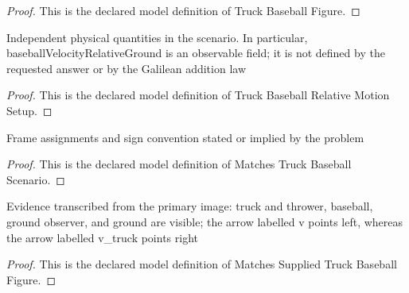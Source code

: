 \begin{proof}
  This is the declared model definition of Truck Baseball Figure.
\end{proof}
\begin{definition}
  \label{def:physics:phyx-mini-0523:phyxminiproblems-problemphyxmini0523-truckbaseballrelativemotionsetup}
  Independent physical quantities in the scenario. In particular, baseballVelocityRelativeGround is an observable field; it is not defined by the requested answer or by the Galilean addition law
\end{definition}
\begin{proof}
  This is the declared model definition of Truck Baseball Relative Motion Setup.
\end{proof}
\begin{definition}
  \label{def:physics:phyx-mini-0523:phyxminiproblems-problemphyxmini0523-matchestruckbaseballscenario}
  Frame assignments and sign convention stated or implied by the problem
\end{definition}
\begin{proof}
  This is the declared model definition of Matches Truck Baseball Scenario.
\end{proof}
\begin{definition}
  \label{def:physics:phyx-mini-0523:phyxminiproblems-problemphyxmini0523-matchessuppliedtruckbaseballfigure}
  Evidence transcribed from the primary image: truck and thrower, baseball, ground observer, and ground are visible; the arrow labelled v points left, whereas the arrow labelled v\_truck points right
\end{definition}
\begin{proof}
  This is the declared model definition of Matches Supplied Truck Baseball Figure.
\end{proof}
